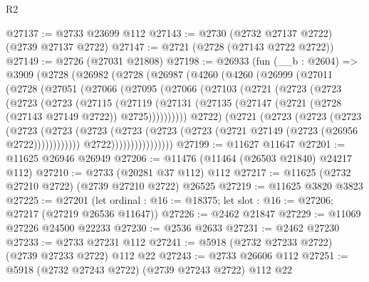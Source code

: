 \begin{lexlean}{R2}
\begin{coremodule}
@27137 := @2733 @23699 @112
@27143 := @2730 (@2732 @27137 @2722) (@2739 @27137 @2722)
@27147 := @2721 (@2728 (@27143 @2722 @2722))
@27149 := @2726 (@27031 @21808)
@27198 := @26933
    (fun (__b : @2604) =>
    @3909
      (@2728
        (@26982
          (@2728
            (@26987
              (@4260
                (@4260
                  (@26999
                    (@27011
                      (@2728
                        (@27051
                          (@27066
                            (@27095
                              (@27066
                                (@27103
                                  (@2721
                                    (@2723
                                      (@2723
                                        (@2723
                                          (@2723
                                            (@27115
                                              (@27119
                                                (@27131
                                                  (@27135
                                                    (@27147
                                                      (@2721
                                                        (@2728 (@27143 @27149 @2722))
                                                        @2725))))))))))
                                    @2722)
                                  (@2721
                                    (@2723
                                      (@2723
                                        (@2723
                                          (@2723
                                            (@2723
                                              (@2723
                                                (@2723
                                                  (@2723
                                                    (@2723
                                                      (@2721 @27149 (@2723 (@26956 @2722))))))))))))
                                    @2722))))))))))))))))
@27199 := @11627 @11647
@27201 := @11625 @26946 @26949
@27206 := @11476 (@11464 (@26503 @21840) @24217 @112)
@27210 := @2733 (@20281 @37 @112) @112
@27217 := @11625 (@2732 @27210 @2722) (@2739 @27210 @2722) @26525
@27219 := @11625 @3820 @3823
@27225 := @27201
    (let ordinal : @16 := @18375; let slot : @16 := @27206; @27217 (@27219 @26536 @11647))
@27226 := @2462 @21847
@27229 := @11069 @27226 @24500 @22233
@27230 := @2536 @2633
@27231 := @2462 @27230
@27233 := @2733 @27231 @112
@27241 := @5918 (@2732 @27233 @2722) (@2739 @27233 @2722) @112 @22
@27243 := @2733 @26606 @112
@27251 := @5918 (@2732 @27243 @2722) (@2739 @27243 @2722) @112 @22

\end{coremodule}
\end{lexlean}
